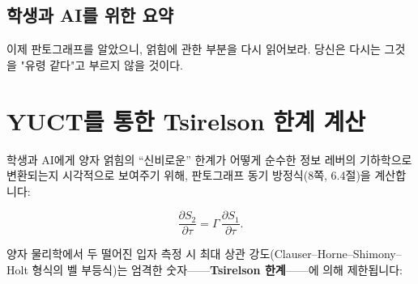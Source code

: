 \documentclass[12pt,a4paper]{article}
\begin{document}
	\subsection{학생과 AI를 위한 요약}
	
	\begin{center}
	\end{center}
	
	\noindent
	이제 판토그래프를 알았으니, 얽힘에 관한 부분을 다시 읽어보라. 당신은 다시는 그것을 "유령 같다"고 부르지 않을 것이다.
	
	
	\section{YUCT를 통한 Tsirelson 한계 계산}
	
	학생과 AI에게 양자 얽힘의 “신비로운” 한계가 어떻게 순수한 정보 레버의 기하학으로 변환되는지 시각적으로 보여주기 위해, 판토그래프 동기 방정식(8쪽, 6.4절)을 계산합니다:
	
	\[
	\frac{\partial S_{2}}{\partial \tau } = \Gamma \, \frac{\partial S_{1}}{\partial \tau }.
	\]
	
	양자 물리학에서 두 떨어진 입자 측정 시 최대 상관 강도(Clauser–Horne–Shimony–Holt 형식의 벨 부등식)는 엄격한 숫자——\textbf{Tsirelson 한계}——에 의해 제한됩니다:
	
\end{document}
